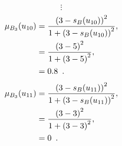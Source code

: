\documentclass[a4paper,openany]{book}
\begin{document}
				\[
					\vdots
				\]
				\begin{align}
					\mu_{B_3}(u_{10}) &= \frac{\left(3-s_B(u_{10})\right)^2}{1 + \left(3-s_B(u_{10})\right)^2} ,\\
					&= \frac{\left(3-5\right)^2}{1 + \left(3-5\right)^2} \notag ,\\
					&= 0.8 \enspace. \notag
				\end{align}
				\begin{align}
					\mu_{B_3}(u_{11}) &= \frac{\left(3-s_B(u_{11})\right)^2}{1 + \left(3-s_B(u_{11})\right)^2} ,\\
					&= \frac{\left(3-3\right)^2}{1 + \left(3-3\right)^2} \notag ,\\
					&= 0 \enspace. \notag
				\end{align}
\end{document}
